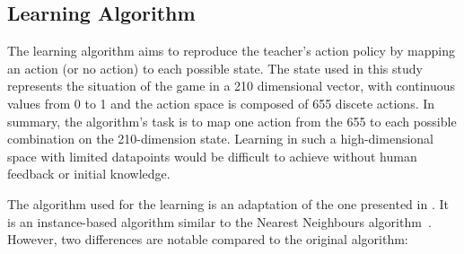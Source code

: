 

\subsection{Learning Algorithm} \label{sec:tuto_algo}
The learning algorithm aims to reproduce the teacher's action policy by mapping an action (or no action) to each possible state. The state used in this study represents the situation of the game in a 210 dimensional vector, with continuous values from 0 to 1 and the action space is composed of 655 discete actions. In summary, the algorithm's task is to map one action from the 655 to each possible combination on the 210-dimension state. Learning in such a high-dimensional space with limited datapoints would be difficult to achieve without human feedback or initial knowledge.

The algorithm used for the learning is an adaptation of the one presented in \cite{senft2017toward}. It is an instance-based algorithm similar to the Nearest Neighbours algorithm~\citep{cover1967nearest}. However, two differences are notable compared to the original algorithm: %

